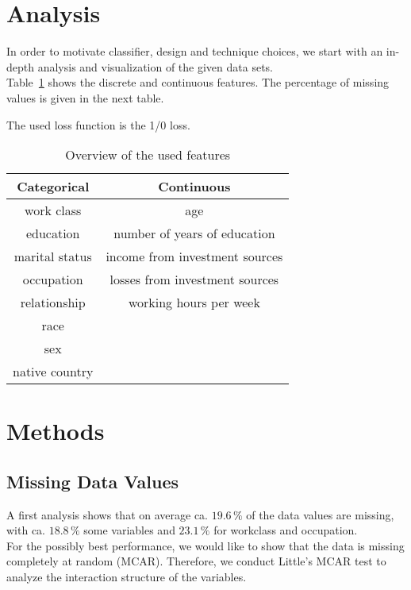 \documentclass{scrartcl}
\begin{document}
\section{Analysis}
\label{sec:analysis}

In order to motivate classifier, design and technique choices, we
start with an in-depth analysis and visualization of the given data
sets.\\

Table~\ref{tab:features} shows the discrete and continuous
features. The percentage of missing values is given in the next table.

The used loss function is the 1/0 loss.


\begin{table}[h]
  \centering
  \begin{tabular}{cc}
    \toprule
  Categorical & Continuous\\
    \midrule
    work class & age\\
    education & number of years of education\\
marital status & income from investment sources\\
occupation & losses from investment sources\\
relationship & working hours per week \\
race & \\
sex & \\
native country & \\
      \bottomrule
  \end{tabular}
  \caption{Overview of the used features}
  \label{tab:features}
\end{table}

\section{Methods}
\label{sec:methods}

\subsection{Missing Data Values}

A first analysis shows that on average ca. $19.6\,\%$ of the data
values are missing, with ca. $18.8\,\%$ some variables and $23.1\,\%$
for workclass and occupation.\\
For the possibly best performance, we would like to show that the data
is missing completely at random (MCAR). Therefore, we conduct Little's
MCAR test \cite{little1988test} to analyze the interaction structure
of the variables.
\end{document}
